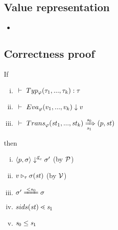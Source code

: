\subsection{Value representation}
\begin{itemize}

\item {}

\begin{comment}
\PT{
	\AC{\ValRep {\lrange{v_1}{v_k}} {\tau} {\v}}
	\UC{\ValRep {\Seqk{v}}{\tseq{\tau}}{(\v,\langle \F_1,..., \F_k, \T \rangle)}}
}\\[4ex]

\item \Jug{\ValRep{\lrange{v_1}{v_k}}{\tau}{\v}}
\PT{
	\Axiom{\ValRep{\lrange{n_1}{n_k}}{\int}{\vrange{n_1}{n_k}}}
}
\PT{
	\AC{\ValRep{v_i}{\tau}{\v}}
	\UC{\ValRep{\lrange{v_1}{v_k}}{\tseq{\tau}}{}}
}

\end{comment}

\end{itemize}


\subsection{Correctness proof}
\begin{lem}
	If 
	\begin{enumerate}[(i)]
	\item $\Type{}{\TypeF{\Tupk{\tau}}}{\tau}$
	\item $\Eval{}{\EvalF{\Tupk{v}}}{v}$
	\item $\tranf{\st_1}{\st_k}{\s_0}{\s_1}{\sfun{p}{\st}}$
	\end{enumerate}
 	then 
 	\begin{enumerate}[(i)]
 		\item $\seval{p}{\sgm}{\a_c}{\sgm'}$ (by $\MP$)
 		\item $\ValRep{v}{\tau}{\sgm(\st)}$ (by $\MV$)
 		\item $\sgm' \ConEq{s_0} \sgm $
 		\item $sids(\st) \SetLe \s_1$
 		\item $\s_0 \le \s_1$
 	\end{enumerate}
\end{lem}


